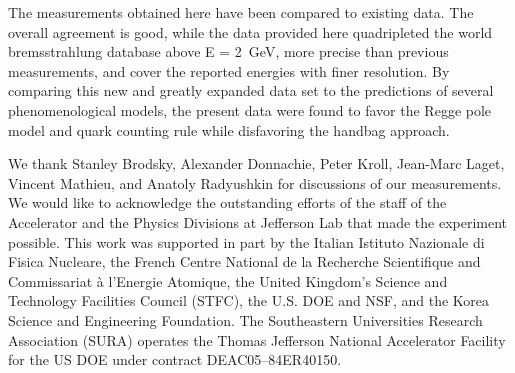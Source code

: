 \documentclass[aps,prc,twocolumn,floatfix,showpacs,preprintnumbers,amsmath,amssymb,superscriptaddress]{revtex4-1}
\begin{document}
The measurements obtained here have been compared to
existing data. The overall agreement is good, while the 
data provided here quadripleted the world bremsstrahlung 
database above E = 2~GeV, more precise than previous 
measurements, and cover the reported energies with finer 
resolution.  By comparing this new and greatly expanded data 
set to the predictions of several phenomenological models, 
the present data were found to favor the Regge pole model 
and quark counting rule while disfavoring the 
handbag approach.  

\FloatBarrier
We thank Stanley Brodsky, Alexander Donnachie, 
Peter Kroll, Jean-Marc Laget, Vincent Mathieu, 
and Anatoly Radyushkin for discussions of our 
measurements. We would like to acknowledge the outstanding 
efforts of the staff of the Accelerator and the Physics 
Divisions at Jefferson Lab that made the experiment possible.  
This work was supported in part by the Italian Istituto 
Nazionale di Fisica Nucleare, the French Centre National de 
la Recherche Scientifique and Commissariat \`a l'Energie 
Atomique, the United Kingdom's Science and Technology 
Facilities Council (STFC), the U.S. DOE and NSF, and the 
Korea Science and Engineering Foundation. The Southeastern 
Universities Research Association (SURA) operates the Thomas 
Jefferson National Accelerator Facility for the US DOE under 
contract DEAC05--84ER40150.
\end{document}
